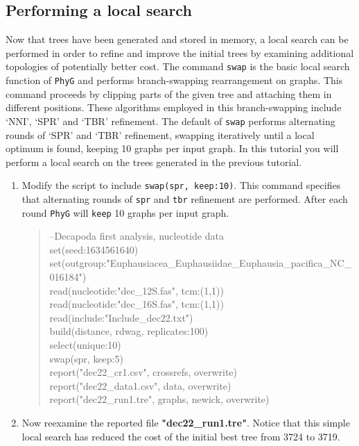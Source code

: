 \documentclass[11pt]{article}
\newcommand{\phyg}{\texttt{PhyG} }
\begin{document}
\subsection{Performing a local search}
\label{subsec:localsearch}

Now that trees have been generated and stored in memory, a local search can be 
performed in order to refine and improve the initial trees by examining additional 
topologies of potentially better cost. The command \texttt{swap} is the basic local 
search function of \phyg and performs branch-swapping rearrangement on graphs. 
This command proceeds by clipping parts of the given tree and attaching them in 
different positions. These algorithms employed in this branch-swapping include 
`NNI', `SPR' and `TBR' refinement. The default of \texttt{swap} performs alternating 
rounds of `SPR' and `TBR' refinement, swapping iteratively until a local optimum 
is found, keeping 10 graphs per input graph. In this tutorial you will perform a local
search on the trees generated in the previous tutorial.

\begin{enumerate}

\item Modify the script to include \texttt{swap(spr, keep:10)}. This command 
specifies that alternating rounds of \texttt{spr} and \texttt{tbr} refinement are performed. 
After each round \phyg will \texttt{keep} 10 graphs per input graph.

	\begin{quote}	
	--Decapoda first analysis, nucleotide data\\
	set(seed:1634561640)\\
	set(outgroup:"Euphausiacea\_Euphausiidae\_Euphausia\_pacifica\_NC\_016184")\\
	read(nucleotide:"dec\_12S.fas", tcm:(1,1))\\
	read(nucleotide:"dec\_16S.fas", tcm:(1,1))\\
	read(include:"Include\_dec22.txt")\\
	build(distance, rdwag, replicates:100)\\
	select(unique:10)\\
	swap(spr, keep:5)\\
	report("dec22\_cr1.csv", crossrefs, overwrite)\\
	report("dec22\_data1.csv", data, overwrite)\\
	report("dec22\_run1.tre", graphs, newick, overwrite)
	\end{quote}
	
\item Now reexamine the reported file \textbf{"dec22\_run1.tre"}. Notice that this 
simple local search has reduced the cost of the initial best tree from 3724 to 3719.

\end{enumerate}
\end{document}
